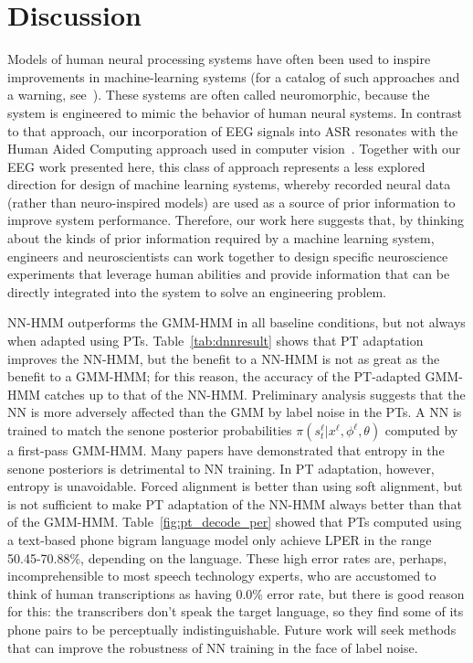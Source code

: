 \section{Discussion}

Models of human neural processing systems have often been used to
inspire improvements in machine-learning systems (for a catalog of
such approaches and a warning, see~\cite{Bourlard96}).  These systems
are often called neuromorphic, because the system is engineered to
mimic the behavior of human neural systems. In contrast to that
approach, our incorporation of EEG signals into ASR resonates with the
Human Aided Computing approach used in computer
vision~\cite{Shenoy08,Wang09}. Together with our EEG work presented
here, this class of approach represents a less explored direction for
design of machine learning systems, whereby recorded neural data
(rather than neuro-inspired models) are used as a source of prior
information to improve system performance. Therefore, our work here
suggests that, by thinking about the kinds of prior information
required by a machine learning system, engineers and neuroscientists
can work together to design specific neuroscience experiments that
leverage human abilities and provide information that can be directly
integrated into the system to solve an engineering problem.

NN-HMM outperforms the GMM-HMM in all baseline conditions, but not
always when adapted using PTs. {\color{blue} Table~\ref{tab:dnnresult}
  shows that PT adaptation improves the NN-HMM, but the benefit to a
  NN-HMM is not as great as the benefit to a GMM-HMM; for this reason,
  the accuracy of the PT-adapted GMM-HMM catches up to that of the
  NN-HMM.}  Preliminary analysis suggests that the NN is more
adversely affected than the GMM by label noise in the PTs.  A NN is
trained to match the senone posterior probabilities
$\pi(s_t^\ell|x^\ell,\phi^\ell,\theta)$ computed by a first-pass
GMM-HMM.  Many papers have demonstrated that entropy in the senone
posteriors is detrimental to NN training.
In PT adaptation, however, entropy is unavoidable.  {\color{blue}
  Forced alignment is better than using soft alignment, but is not
  sufficient to make PT adaptation of the NN-HMM always better than
  that of the GMM-HMM.  Table~\ref{fig:pt_decode_per} showed that PTs
  computed using a text-based phone bigram language model only achieve
  LPER in the range 50.45-70.88\%, depending on the language.  These
  high error rates are, perhaps, incomprehensible to most speech
  technology experts, who are accustomed to think of human
  transcriptions as having 0.0\% error rate, but} there is good reason
for this: the transcribers don't speak the target language, so they
find some of its phone pairs to be perceptually indistinguishable.
Future work will seek methods that can improve the robustness of NN
training in the face of label noise.

